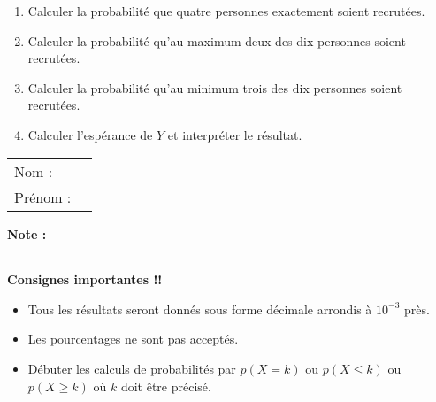 \documentclass[10pt,french]{book}
\newcommand\competences{
\setcounter{exo}{0}
\begin{tabular}{ll} Nom : \\[5pt] Prénom : \end{tabular}
\hfill
\textbf{Note :}\renewcommand\arraystretch{2.3}
\begin{tabularx}{0.18\linewidth}{|X|}
\hline
\slashbox{\Huge\bfseries\phantom{10}}{\Huge\bfseries 10}\\
\hline
\end{tabularx}\renewcommand\arraystretch{1}\medskip
}
\begin{document}
\begin{enumerate}
        \begin{enumerate}
            \item Calculer la probabilité que quatre personnes exactement soient recrutées.
            \item Calculer la probabilité qu'au maximum deux des dix personnes soient recrutées.
            \item Calculer la probabilité qu'au minimum trois des dix personnes soient recrutées.
            \item Calculer l'espérance de $Y$ et interpréter le résultat.
        \end{enumerate}
\end{enumerate}

\clearpage
{}
\competences\bigskip

{\bfseries
    Consignes importantes !!\par
        \begin{itemize}
            \item Tous les résultats seront donnés sous forme décimale arrondis à $10^{-3}$ près.
            \item Les pourcentages ne sont pas acceptés.
            \item Débuter les calculs de probabilités par $p(X = k)$ ou $p(X \leq k)$ ou $p(X \geq k)$ où $k$ doit être précisé.
        \end{itemize}
}\medskip
\end{document}
